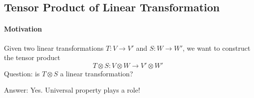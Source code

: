 \subsection{Tensor Product of Linear Transformation}
\paragraph{Motivation}
Given two linear transformations $T:V\to V'$ and $S:W\to W'$, we want to construct the tensor product 
\[
T\otimes S:
V\otimes W
\to V'\otimes W'
\]
Question: is $T\otimes S$ a linear transformation?

Answer: Yes.
Universal property plays a role!














